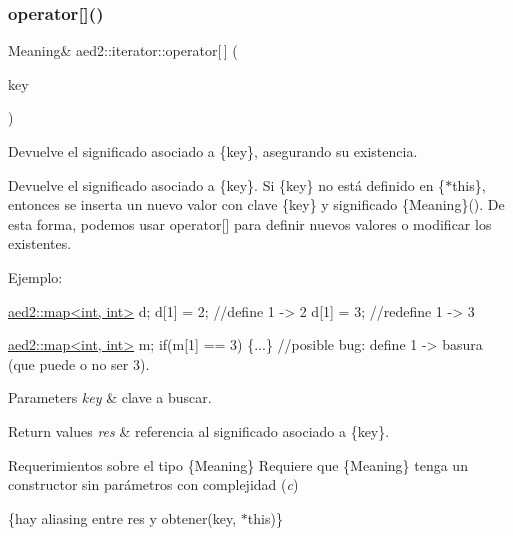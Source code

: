 \subsubsection{\texorpdfstring{operator[]()}{operator[]()}}
{\footnotesize\ttfamily Meaning\& aed2\+::iterator\+::operator\mbox{[}$\,$\mbox{]} (\begin{DoxyParamCaption}\item[{const Key \&}]{key }\end{DoxyParamCaption})\hspace{0.3cm}{\ttfamily [inline]}}



Devuelve el significado asociado a \{key\}, asegurando su existencia. 

Devuelve el significado asociado a \{key\}. Si \{key\} no está definido en \{$\ast$this\}, entonces se inserta un nuevo valor con clave \{key\} y significado \{Meaning\}(). De esta forma, podemos usar {\ttfamily operator\mbox{[}\mbox{]}} para definir nuevos valores o modificar los existentes.

Ejemplo\+: 
\begin{DoxyCode}
\hyperlink{classaed2_1_1map}{aed2::map<int, int>} d;
d[1] = 2;      \textcolor{comment}{//define 1 -> 2}
d[1] = 3;      \textcolor{comment}{//redefine 1 -> 3}

\hyperlink{classaed2_1_1map}{aed2::map<int, int>} m;
\textcolor{keywordflow}{if}(m[1] == 3) \{...\} \textcolor{comment}{//posible bug: define 1 -> basura (que puede o no ser 3).}
\end{DoxyCode}



\begin{DoxyParams}{Parameters}
{\em key} & clave a buscar. \\
\hline
\end{DoxyParams}

\begin{DoxyRetVals}{Return values}
{\em res} & referencia al significado asociado a \{key\}.\\
\hline
\end{DoxyRetVals}
\begin{DoxyParagraph}{Requerimientos sobre el tipo \{Meaning\}}
Requiere que \{Meaning\} tenga un constructor sin parámetros con complejidad ({\itshape c})
\end{DoxyParagraph}
\{hay aliasing entre res y obtener(key, $\ast$this)\}

